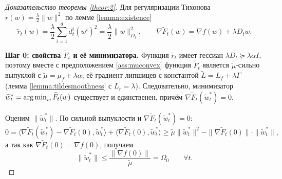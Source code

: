 \begin{proof}[Доказательство теоремы \ref{theor:2}]
Для регуляризации Тихонова $r(w) = \frac{\lambda}{2}\|w\|^2$ по лемме \ref{lemma:existence}
$$\widetilde{r}_t(w) = \frac{\lambda}{2} \sum_{i=1}^d d_t^i (w^i)^2 = \frac{\lambda}{2}\|w\|_{D_t}^2, \qquad \nabla \widetilde{F}_t(w) = \nabla f(w) + \lambda D_t w.$$

\textbf{Шаг 0: свойства $\widetilde{F}_t$ и её минимизатора.}
Функция $\widetilde{r}_t$ имеет гессиан $\lambda D_t \succcurlyeq \lambda \alpha I$, поэтому вместе с предположением \ref{ass:muconvex} функция $\widetilde{F}_t$ является $\widetilde{\mu}$-сильно выпуклой с $\widetilde{\mu} = \mu_f + \lambda\alpha$; её градиент липшицев с константой $\widetilde{L} = L_f + \lambda\Gamma$ (лемма \ref{lemma:tildesmoothness} с $L_r = \lambda$). Следовательно, минимизатор $\widetilde{w}^*_t = \operatorname*{arg\,min}_w \widetilde{F}_t(w)$ существует и единственен, причём $\nabla \widetilde{F}_t(\widetilde{w}^*_t) = 0$.

Оценим $\|\widetilde{w}^*_t\|$. По сильной выпуклости и $\nabla\widetilde{F}_t(\widetilde{w}^*_t) = 0$:
\begin{equation*}
0 = \langle \nabla \widetilde{F}_t(\widetilde{w}^*_t) - \nabla \widetilde{F}_t(0), \widetilde{w}^*_t \rangle + \langle \nabla \widetilde{F}_t(0), \widetilde{w}^*_t \rangle \ge \widetilde{\mu}\|\widetilde{w}^*_t\|^2 - \|\nabla \widetilde{F}_t(0)\|\cdot\|\widetilde{w}^*_t\|,
\end{equation*}
а так как $\nabla \widetilde{F}_t(0) = \nabla f(0)$, получаем
\begin{equation}
\label{eq:omega0}
\|\widetilde{w}^*_t\| \le \frac{\|\nabla f(0)\|}{\widetilde{\mu}} = \Omega_0 \qquad \forall t.
\end{equation}


\end{proof}
